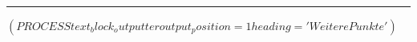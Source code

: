 \documentclass{scrartcl}
\begin{document}

\vspace{0.2cm}
\hrule
\vspace{0.4cm}


%

$( PROCESS text_block_outputter output_position=1 heading='Weitere Punkte' )$
\end{document}
